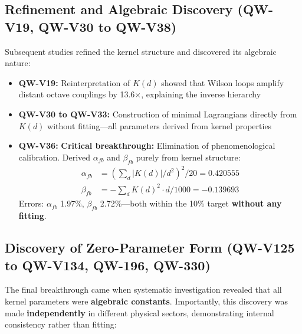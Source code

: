 \documentclass[11pt, a4paper]{article}
\begin{document}
\subsection{Refinement and Algebraic Discovery (QW-V19, QW-V30 to QW-V38)}

Subsequent studies refined the kernel structure and discovered its algebraic nature:

\begin{itemize}
    \item \textbf{QW-V19:} Reinterpretation of $K(d)$ showed that Wilson loops amplify distant octave couplings by 13.6$\times$, explaining the inverse hierarchy
    \item \textbf{QW-V30 to QW-V33:} Construction of minimal Lagrangians directly from $K(d)$ without fitting—all parameters derived from kernel properties
    \item \textbf{QW-V36:} \textbf{Critical breakthrough:} Elimination of phenomenological calibration. Derived $\alpha_{fb}$ and $\beta_{fb}$ purely from kernel structure:
    \begin{align}
    \alpha_{fb} &= \left(\sum_d |K(d)|/d^2\right)^2 / 20 = 0.420555\\
    \beta_{fb} &= -\sum_d K(d)^2 \cdot d / 1000 = -0.139693
    \end{align}
    Errors: $\alpha_{fb}$ 1.97\%, $\beta_{fb}$ 2.72\%—both within the 10\% target \textbf{without any fitting}.
\end{itemize}

\subsection{Discovery of Zero-Parameter Form (QW-V125 to QW-V134, QW-196, QW-330)}

The final breakthrough came when systematic investigation revealed that all kernel parameters were \textbf{algebraic constants}. Importantly, this discovery was made \textbf{independently} in different physical sectors, demonstrating internal consistency rather than fitting:
\end{document}
